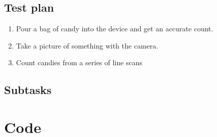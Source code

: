 \documentclass{article}
\begin{document}
\subsection{Test plan}
\begin{enumerate}
    \item Pour a bag of candy into the device and get an accurate count.
    \item Take a picture of something with the camera.
    \item Count candies from a series of line scans
\end{enumerate}

\subsection{Subtasks}




    

\appendix
\section{Code}\label{appendix:code}

%
\end{document}
